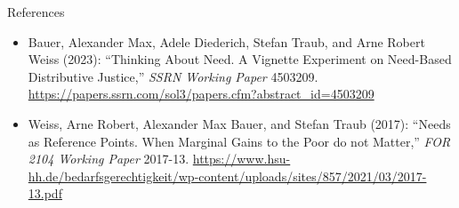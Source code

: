\documentclass[xcolor=table,9pt,aspectratio=169]{beamer}
\begin{document}
\begin{frame}{\vspace*{10mm}References}
   \vspace*{-10mm}
   {\footnotesize
   \begin{itemize}[label=,leftmargin=2em,itemindent=-2em]
      \item Bauer, Alexander Max, Adele Diederich, Stefan Traub, and Arne Robert Weiss (2023): \enquote{Thinking About Need. A Vignette Experiment on Need-Based Distributive Justice,} \textit{SSRN Working Paper} 4503209. \url{https://papers.ssrn.com/sol3/papers.cfm?abstract_id=4503209}
      \item Weiss, Arne Robert, Alexander Max Bauer, and Stefan Traub (2017): \enquote{Needs as Reference Points. When Marginal Gains to the Poor do not Matter,} \textit{FOR 2104 Working Paper} 2017-13. \url{https://www.hsu-hh.de/bedarfsgerechtigkeit/wp-content/uploads/sites/857/2021/03/2017-13.pdf}
   \end{itemize}
   }
\end{frame}
\end{document}
